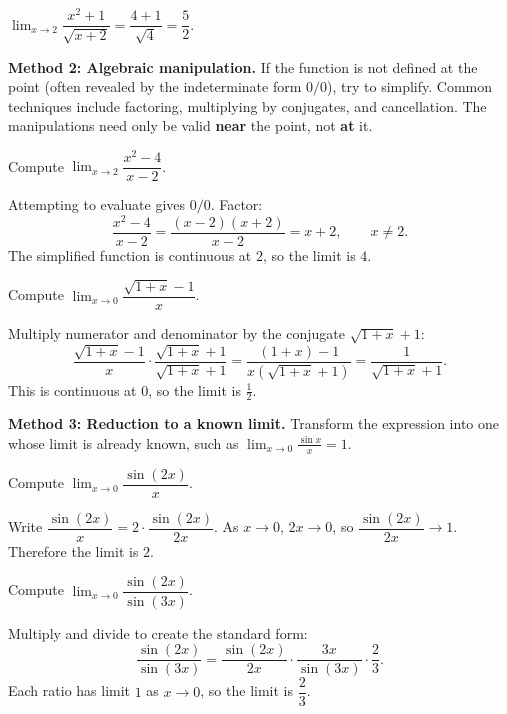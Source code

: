 \begin{example}
\label{ex:2-12}
$\displaystyle\lim_{x \to 2} \dfrac{x^{2} + 1}{\sqrt{x + 2}} = \dfrac{4 + 1}{\sqrt{4}} = \dfrac{5}{2}.$
\end{example}

\textbf{Method 2: Algebraic manipulation.}  If the function is not defined at the point (often revealed by the indeterminate form $0/0$), try to simplify.  Common techniques include factoring, multiplying by conjugates, and cancellation.  The manipulations need only be valid \textbf{near} the point, not \textbf{at} it.

\begin{example}
\label{ex:2-13}
Compute $\displaystyle\lim_{x \to 2} \dfrac{x^{2} - 4}{x - 2}$.

Attempting to evaluate gives $0/0$.  Factor:
\[
  \dfrac{x^{2} - 4}{x - 2} = \dfrac{(x-2)(x+2)}{x-2} = x + 2, \qquad x \neq 2.
\]
The simplified function is continuous at $2$, so the limit is $4$.
\end{example}

\begin{example}
\label{ex:2-14}
Compute $\displaystyle\lim_{x \to 0} \dfrac{\sqrt{1 + x} - 1}{x}$.

Multiply numerator and denominator by the conjugate $\sqrt{1+x} + 1$:
\[
  \dfrac{\sqrt{1+x} - 1}{x} \cdot \dfrac{\sqrt{1+x}+1}{\sqrt{1+x}+1}
  = \dfrac{(1+x) - 1}{x(\sqrt{1+x}+1)}
  = \dfrac{1}{\sqrt{1+x} + 1}.
\]
This is continuous at $0$, so the limit is $\frac{1}{2}$.
\end{example}

\textbf{Method 3: Reduction to a known limit.}  Transform the expression into one whose limit is already known, such as $\lim_{x \to 0} \frac{\sin x}{x} = 1$.

\begin{example}
\label{ex:2-15}
Compute $\displaystyle\lim_{x \to 0} \dfrac{\sin(2x)}{x}$.

Write $\dfrac{\sin(2x)}{x} = 2 \cdot \dfrac{\sin(2x)}{2x}$.  As $x \to 0$, $2x \to 0$, so $\dfrac{\sin(2x)}{2x} \to 1$.  Therefore the limit is $2$.
\end{example}

\begin{example}
\label{ex:2-16}
Compute $\displaystyle\lim_{x \to 0} \dfrac{\sin(2x)}{\sin(3x)}$.

Multiply and divide to create the standard form:
\[
  \dfrac{\sin(2x)}{\sin(3x)}
  = \dfrac{\sin(2x)}{2x} \cdot \dfrac{3x}{\sin(3x)} \cdot \dfrac{2}{3}.
\]
Each ratio has limit $1$ as $x \to 0$, so the limit is $\dfrac{2}{3}$.
\end{example}

